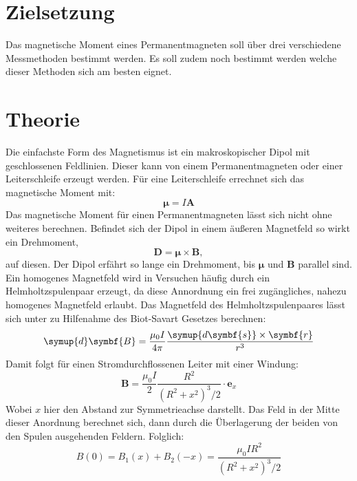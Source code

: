 \section{Zielsetzung}
Das magnetische Moment eines Permanentmagneten soll über drei verschiedene Messmethoden bestimmt werden.
Es soll zudem noch bestimmt werden welche dieser Methoden sich am besten eignet.
\section{Theorie}
\label{sec:Theorie}
Die einfachste Form des Magnetismus ist ein makroskopischer Dipol mit geschlossenen Feldlinien.
Dieser kann von einem Permanentmagneten oder einer Leiterschleife erzeugt werden.
Für eine Leiterschleife errechnet sich das magnetische Moment mit:
\begin{equation}
  \symbf{\mu} = I \symbf{A}
\end{equation}
Das magnetische Moment für einen Permanentmagneten lässt sich nicht ohne weiteres berechnen.
Befindet sich der Dipol in einem äußeren Magnetfeld so wirkt ein Drehmoment,
\begin{equation}
  \symbf{D} = \symbf{\mu}\times \symbf{B},
\end{equation}
auf diesen.
Der Dipol erfährt so lange ein Drehmoment, bis $\symbf{\mu}$ und $\symbf{B}$ parallel sind.
Ein homogenes Magnetfeld wird in Versuchen häufig durch ein Helmholtzspulenpaar erzeugt, da diese Annordnung ein frei
zugängliches, nahezu homogenes Magnetfeld erlaubt.
Das Magnetfeld des Helmholtzspulenpaares lässt sich unter zu Hilfenahme des Biot-Savart Gesetzes berechnen:
\begin{equation}
\symup{d}\symbf{B}= \frac{\mu_0 I}{4 \pi} \frac{\symup{d\symbf{s}}\times \symbf{r}}{r^3}
\end{equation}
Damit folgt für einen Stromdurchflossenen Leiter mit einer Windung:
\begin{equation}
  \symbf{B}=\frac{\mu_0 I}{2} \frac{R^2}{(R^2 + x^2)^3/2 } \cdot \symbf{e}_x
\end{equation}
Wobei $x$ hier den Abstand zur Symmetrieachse darstellt.
Das Feld in der Mitte dieser Anordnung berechnet sich, dann durch die Überlagerung der beiden von den Spulen ausgehenden
Feldern.
Folglich:
\begin{equation}
  B(0)= B_1(x)+B_2(-x) = \frac{\mu_0 I R^2}{(R^2+x^2)^3/2}
\end{equation}
%
